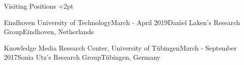 \documentclass{resume} %
\begin{document}

\begin{rSection}{Visiting Positions} \itemsep +2pt

\begin{rSubsection}{Eindhoven University of Technology}{March - April 2019}{Dan\"{\i}el Laken's Research Group}{Eindhoven, Netherlands}
\item[]\vspace{-1.5\baselineskip}
\end{rSubsection}


\begin{rSubsection}{Knowledge Media Research Center, University of T{\"u}bingen}{March - September 2017}{Sonia Utz's Research Group}{T{\"u}bingen, Germany}
\item[]\vspace{-1.5\baselineskip}

\end{rSubsection}

\end{rSection}
\end{document}
